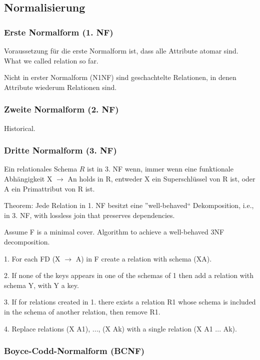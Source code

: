 %
%
\subsection{Normalisierung}

\subsubsection{Erste Normalform (1. NF)}

Voraussetzung für die erste Normalform ist, dass alle Attribute atomar sind.
What we called relation so far.

Nicht in erster Normalform (N1NF) sind geschachtelte Relationen, in denen Attribute wiederum Relationen sind.

\subsubsection{Zweite Normalform (2. NF)}

Historical.

\subsubsection{Dritte Normalform (3. NF)}

Ein relationales Schema $R$ ist in 3. NF wenn, immer wenn eine funktionale Abhängigkeit X $\rightarrow$ An holds in R, entweder X ein Superschlüssel von R ist, oder A ein Primattribut von R ist.

Theorem:
Jede Relation in 1. NF besitzt eine ”well-behaved“ Dekomposition, i.e., in 3. NF, with lossless join that preserves dependencies.

Assume F is a minimal cover.
Algorithm to achieve a well-behaved 3NF decomposition.

1. For each FD (X $\rightarrow$ A) in F create a relation with schema (XA).

2. If none of the keys appears in one of the schemas of 1 then add a relation with schema Y, with Y a key.

3. If for relations created in 1. there exists a relation R1 whose schema is included in the schema of another relation, then remove R1.

4. Replace relations (X A1), ..., (X Ak) with a single relation (X A1 ... Ak).

\subsubsection{Boyce-Codd-Normalform (BCNF)}


